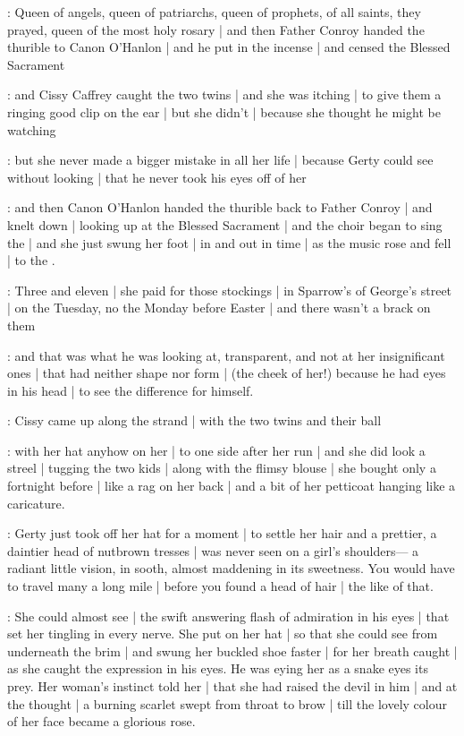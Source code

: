 \Nrelig:
Queen of angels,
queen of patriarchs,
queen of prophets,
of all saints,
they prayed,
queen of the most holy rosary |%
and then Father Conroy
handed the thurible
to Canon O'Hanlon |
and he put in the incense |
and censed the Blessed Sacrament

:
and Cissy Caffrey caught the two twins |
and she was itching |
to give them a ringing good clip on the ear |
but she didn't |
because she thought
he might be watching

\gertySex:
but she never made a bigger mistake in all her life |
because Gerty could see without looking |
that he never took his eyes off of her

\Nrelig:
and then Canon O'Hanlon
handed the thurible
back to Father Conroy |
and knelt down |
looking up at the Blessed Sacrament |
and the choir
began to sing the  |
and she just swung her foot |
in and out in time |
as the music rose and fell |
to the .

\gertyReal:
Three and eleven |
she paid for those stockings |%
in Sparrow's of George's street |
on the Tuesday,
no the Monday before Easter |
and there wasn't a brack on them

\gertySex:
and that was what he was looking at,
transparent,
and not at her insignificant ones |
that had neither shape nor form |
(the cheek of her!)
because he had eyes in his head |
to see the difference
for himself.

:
Cissy came up along the strand |
with the two twins
and their ball

\gertyJudgy:
with her hat anyhow on her |
to one side after her run |
and she did look a streel |
tugging the two kids |
along with the flimsy blouse |
she bought only a fortnight before |
like a rag on her back |
and a bit of her petticoat
hanging like a caricature.

\gertyNovel:
Gerty just took off her hat for a moment |
to settle her hair
and a prettier,
a daintier head of nutbrown tresses |%
was never seen on a girl's shoulders—%
a radiant little vision,
in sooth,
almost maddening
in its sweetness.
You would have to travel
many a long mile |
before you found
a head of hair |
the like of that.

\gertySex:
She could almost see |
the swift answering flash of admiration in his eyes |
that set her tingling
in every nerve.
She put on her hat |
so that she could see from underneath
the brim |
and swung her buckled shoe faster |
for her breath caught |
as she caught the expression
in his eyes.
He was eying her
as a snake eyes its prey.
Her woman's instinct told her |
that she had raised the devil in him |
and at the thought |
a burning scarlet
swept from throat to brow |
till the lovely colour of her face
became a glorious rose.%

